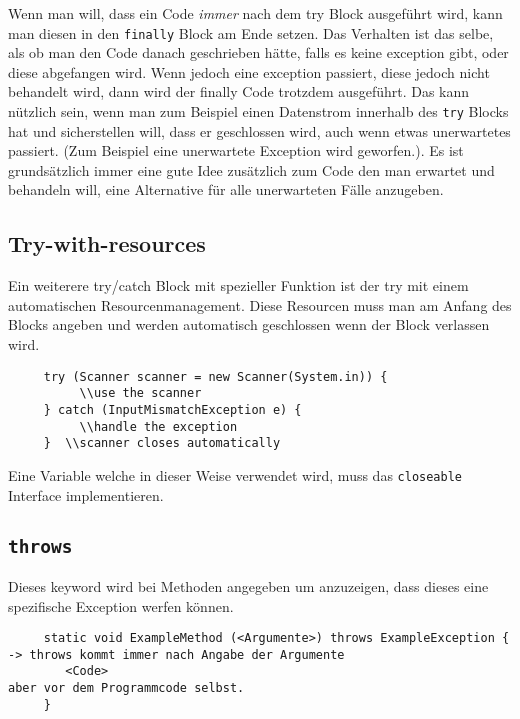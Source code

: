 \documentclass{article}
\begin{document}
	 Wenn man will, dass ein Code \textit{immer} nach dem try Block ausgeführt wird, kann man diesen in den \verb|finally| Block am Ende setzen. Das Verhalten ist das selbe, als ob man den Code danach geschrieben hätte, falls es keine exception gibt, oder diese abgefangen wird. Wenn jedoch eine exception passiert, diese jedoch nicht behandelt wird, dann wird der finally Code trotzdem ausgeführt. Das kann nützlich sein, wenn man zum Beispiel einen Datenstrom innerhalb des \verb|try| Blocks hat und sicherstellen will, dass er geschlossen wird, auch wenn etwas unerwartetes passiert. (Zum Beispiel eine unerwartete Exception wird geworfen.). Es ist grundsätzlich immer eine gute Idee zusätzlich zum Code den man erwartet und behandeln will, eine Alternative für alle unerwarteten Fälle anzugeben.  \\
	 \subsection{Try-with-resources}
	 Ein weiterere try/catch Block mit spezieller Funktion ist der try mit einem automatischen Resourcenmanagement. Diese Resourcen muss man am Anfang des Blocks angeben und werden automatisch geschlossen wenn der Block verlassen wird.
	 \begin{verbatim}
	 try (Scanner scanner = new Scanner(System.in)) {
	 	  \\use the scanner
	 } catch (InputMismatchException e) {
	 	  \\handle the exception
	 }  \\scanner closes automatically
	 \end{verbatim}
	 Eine Variable welche in dieser Weise verwendet wird, muss das \verb|closeable| Interface implementieren.
	 \subsection{\texorpdfstring{\texttt{throws}}{throws}}
	 Dieses keyword wird bei Methoden angegeben um anzuzeigen, dass dieses eine spezifische Exception werfen können.
	 \begin{verbatim}
	 static void ExampleMethod (<Argumente>) throws ExampleException { -> throws kommt immer nach Angabe der Argumente
	 	<Code> 	                                                          aber vor dem Programmcode selbst.
	 }
	 \end{verbatim}
\end{document}
